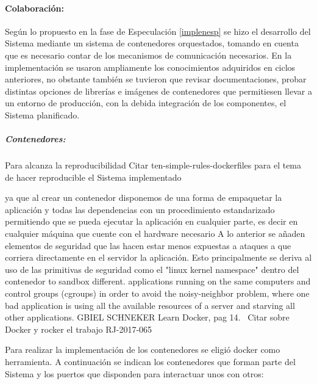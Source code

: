 \documentclass[
  12pt,
  openany]{book}
\begin{document}
\hypertarget{implemencolab}{%
\paragraph{Colaboración:}\label{implemencolab}}

Según lo propuesto en la fase de Especulación \ref{implenesp} se hizo el desarrollo del Sistema mediante un sistema de contenedores orquestados, tomando en cuenta que es necesario contar de los mecanismos de comunicación necesarios. En la implementación se usaron ampliamente los conocimientos adquiridos en ciclos anteriores, no obstante también se tuvieron que revisar documentaciones, probar distintas opciones de librerías e imágenes de contenedores que permitiesen llevar a un entorno de producción, con la debida integración de los componentes, el Sistema planificado.

\hypertarget{contenedores-1}{%
\subparagraph{Contenedores:}\label{contenedores-1}}

Para alcanza la reproducibilidad Citar ten-simple-rules-dockerfiles para el tema de hacer reproducible el Sistema implementado

ya que al crear un contenedor disponemos de una forma de empaquetar la aplicación y todas las dependencias con un procedimiento estandarizado permitiendo que se pueda ejecutar la aplicación en cualquier parte, es decir en cualquier máquina que cuente con el hardware necesario A lo anterior se añaden elementos de seguridad que las hacen estar menos expuestas a ataques a que corriera directamente en el servidor la aplicación. Esto principalmente se deriva al uso de las primitivas de seguridad como el "linux kernel namespace" dentro del contenedor to sandbox different. applications running on the same computers and control groups (cgroups) in order to avoid the noisy-neighbor problem, where one bad application is using all the available resources of a server and starving all other applications. GBIEL SCHNEKER Learn Docker, pag 14.~ Citar sobre Docker y rocker el trabajo RJ-2017-065

Para realizar la implementación de los contenedores se eligió docker como herramienta. A continuación se indican los contenedores que forman parte del Sistema y los puertos que disponden para interactuar unos con otros:
\end{document}
